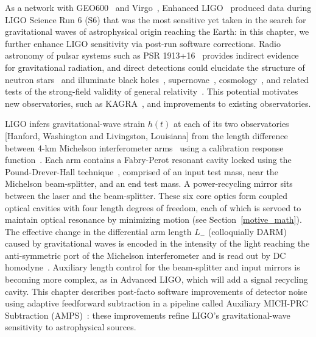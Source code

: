 	As a network with GEO600~\cite{Willke2002,Hild2009} and Virgo~\cite{Acernese2005}, Enhanced LIGO~\cite{LIGOFirst2004,Fricke2009} produced data during LIGO Science Run 6 (S6) that was the most sensitive yet taken in the search for gravitational waves of astrophysical origin reaching the Earth: in this chapter, we further enhance LIGO sensitivity via post-run software corrections. Radio astronomy of pulsar systems such as PSR 1913+16~\cite{HulseTaylor1975,Weisberg2010} provides indirect evidence for gravitational radiation, and direct detections could elucidate the structure of neutron stars~\cite{Lindblom1995,AbbottPulsar2006} and illuminate black holes~\cite{Sathyaprakash2009}, supernovae~\cite{Chandrasekhar1969,Ott2009}, cosmology~\cite{Grishchuk1974}, and related tests of the strong-field validity of general relativity~\cite{Riles2013}. This potential motivates new observatories, such as KAGRA~\cite{Kuroda2010}, and improvements to existing observatories. 

LIGO infers gravitational-wave strain $h(t)$ at each of its two observatories [Hanford, Washington and Livingston, Louisiana] from the length difference between 4-km Michelson interferometer arms~\cite{Saulson} using a calibration response function~\cite{AbadieCalibration2010}. Each arm contains a Fabry-Perot resonant cavity locked using the Pound-Drever-Hall technique~\cite{Drever1983,Black2001}, comprised of an input test mass, near the Michelson beam-splitter, and an end test mass. A power-recycling mirror sits between the laser and the beam-splitter. These six core optics form coupled optical cavities with four length degrees of freedom, each of which is servoed to maintain optical resonance by minimizing motion (see Section~\ref{motive_math}). The effective change in the differential arm length $L_-$ (colloquially DARM) caused by gravitational waves is encoded in the intensity of the light reaching the anti-symmetric port of the Michelson interferometer and is read out by DC homodyne~\cite{Fricke2009}. Auxiliary length control for the beam-splitter and input mirrors is becoming more complex, as in Advanced LIGO, which will add a signal recycling cavity. This chapter describes post-facto software improvements of detector noise using adaptive feedforward subtraction in a pipeline called Auxiliary MICH-PRC Subtraction (AMPS)~\cite{MatappsRepository}: these improvements refine LIGO's gravitational-wave sensitivity to astrophysical sources.

